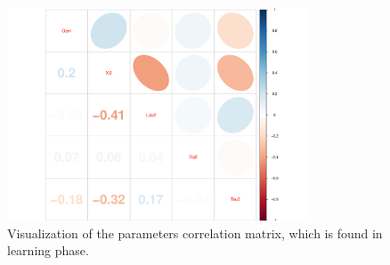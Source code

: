 \documentclass{beamer}
\begin{document}
%


\begin{frame}
\begin{figure}[h]
\centering
\includegraphics[width=0.8\textwidth]{../Chapters/05MCMCOU/plots/realdatalearningcorMatrix.pdf}
\caption{Visualization of the parameters correlation matrix, which is found in learning phase. }\label{realdatacorMatrix}
\end{figure}

\end{frame}
\end{document}
